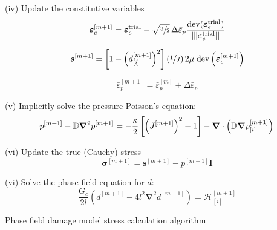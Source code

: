 \documentclass[sn-mathphys,Numbered,draft]{sn-jnl}%
\newcommand{\bb}{\boldsymbol}
\begin{document}
\begin{algorithm}[htbp]
(iv) Update the constitutive variables
\begin{equation}
	\boldsymbol{\varepsilon}_{e}^{[m+1]} =
		\bb{\varepsilon}_{e}^{\text{trial}}
		- \sqrt{\sfrac{3}{2}} \, \Delta \bar{\varepsilon}_p 
		\frac{\text{dev}(\bb{\varepsilon}_{e}^{\text{trial}})}{\||\bb{\varepsilon}_{e}^{\text{trial}}||}
		\nonumber
\end{equation}

\begin{equation}
	\boldsymbol{s}^{[m+1]}
	=
	\left[1 - \left(d^{[m+1]}_{[i]}\right)^2 \right] (\sfrac{1}{J}) \, 2\mu \;\text{dev}\left(\boldsymbol{\varepsilon}_{e}^{[m+1]}\right) \nonumber
\end{equation}




\begin{equation}
	\bar{\varepsilon}_p^{[m+1]} = \bar{\varepsilon}_p^{[m]} + \Delta \bar{\varepsilon}_p \nonumber
\end{equation}



(v) Implicitly solve the pressure Poisson's equation:
\begin{equation}
	p^{[m+1]} - \mathbb{D} \bb{\nabla}^2 p^{[m+1]} =
	-\frac{\kappa}{2} \left[\left(J^{[m+1]}\right)^{2} - 1\right]
	- \bb{\nabla} \cdot \left( \mathbb{D} \bb{\nabla} p^{[m+1]}_{[i]} \right) \\
\end{equation}


(vi) Update the true (Cauchy) stress
\begin{equation}
	\boldsymbol{\sigma}^{[m+1]} = \boldsymbol{s}^{[m+1]} -  p^{[m+1]}\textbf{I} \nonumber
\end{equation}


(vi) Solve the phase field equation for $d$:
\begin{equation}
	\frac{G_c}{2l}\left(d^{[m+1]} -4l^2 \bb{\nabla}^2 d^{[m+1]} \right) =
	\mathcal{H}^{[m+1]}_{[i]} %
\end{equation}

\caption{Phase field damage model stress calculation algorithm}
\end{algorithm}
\end{document}

